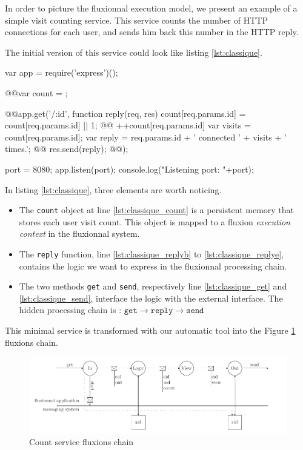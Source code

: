 In order to picture the fluxionnal execution model, we present an example of a simple visit counting service.
This service counts the number of HTTP connections for each user, and sends him back this number in the HTTP reply.

The initial version of this service could look like listing \ref{lst:classique}.

\begin{code}[Javascript, caption={Initial service},label={lst:classique}]
var app = require('express')();

@\label{lst:classique_count}@var count = {};

@\label{lst:classique_get}\label{lst:classique_replyb}@app.get('/:id', function reply(req, res){
  count[req.params.id] = count[req.params.id]  || 1; @\label{lst:classique_dynres}@
  ++count[req.params.id] 
  var visits = count[req.params.id];
  var reply = req.params.id + ' connected ' + visits + ' times.';
@\label{lst:classique_send}@  res.send(reply);
@\label{lst:classique_replye}@});

port = 8080;
app.listen(port);
console.log("Listening port: "+port);
\end{code}

In listing \ref{lst:classique}, three elements are worth noticing.

\begin{itemize}
  \item The \texttt{count} object at line \ref{lst:classique_count} is a persistent memory that stores each user visit count.
  This object is mapped to a fluxion \textit{execution context} in the fluxionnal system.
  \item The \texttt{reply} function, line \ref{lst:classique_replyb} to \ref{lst:classique_replye}, contains the logic we want to express in the fluxionnal processing chain.
  \item The two methods \texttt{get} and \texttt{send}, respectively line \ref{lst:classique_get} and \ref{lst:classique_send}, interface the logic with the external interface.
  The hidden processing chain is : $\texttt{get} \to \texttt{reply} \to \texttt{send}$
\end{itemize}

This minimal service is transformed with our automatic tool into the Figure \ref{fig:fluxions} fluxions chain.

\begin{figure}[h!]
  \includegraphics[width=\linewidth]{flux.pdf}
  \caption{Count service fluxions chain}
  \label{fig:fluxions}
\end{figure}

